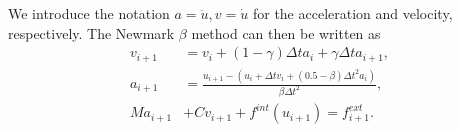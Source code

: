 \documentclass[a4paper,10pt]{article}
\begin{document}
We introduce the notation $a= \ddot{u}, v=\dot{u}$
for the acceleration and velocity, respectively. The Newmark $\beta$ method can then
be written as
\begin{align}
v_{i+1} &= v_i + (1-\gamma) \Delta t a_i + \gamma \Delta t a_{i+1}, \\
a_{i+1} &= \frac{u_{i+1} - (u_i + \Delta t v_i + (0.5 - \beta) \Delta t^2 a_i)}{\beta \Delta t^2}, \\
Ma_{i+1} &+ C v_{i+1} + f^{int}(u_{i+1}) = f^{ext}_{i+1}.
\end{align}
\end{document}
